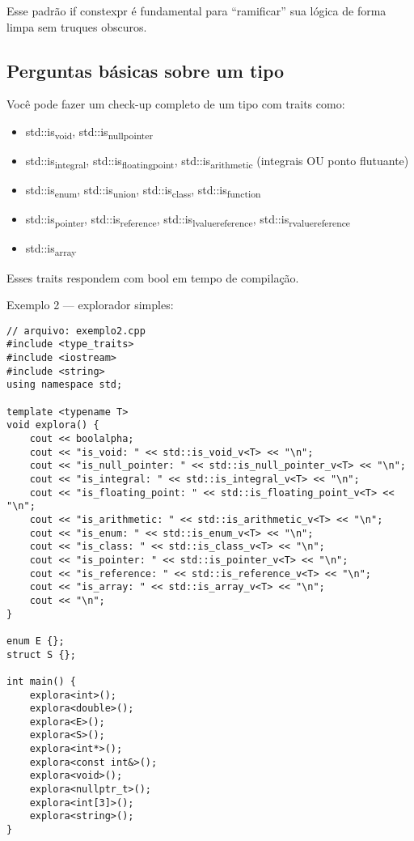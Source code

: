 \documentclass[11pt]{article}
\begin{document}
Esse padrão if constexpr é fundamental para “ramificar” sua lógica de forma limpa sem truques obscuros.
\subsection{Perguntas básicas sobre um tipo}
\label{sec:org7e893dd}

Você pode fazer um check-up completo de um tipo com traits como:
\begin{itemize}
\item std::is\textsubscript{void}, std::is\textsubscript{null}\textsubscript{pointer}
\item std::is\textsubscript{integral}, std::is\textsubscript{floating}\textsubscript{point}, std::is\textsubscript{arithmetic} (integrais OU ponto flutuante)
\item std::is\textsubscript{enum}, std::is\textsubscript{union}, std::is\textsubscript{class}, std::is\textsubscript{function}
\item std::is\textsubscript{pointer}, std::is\textsubscript{reference}, std::is\textsubscript{lvalue}\textsubscript{reference}, std::is\textsubscript{rvalue}\textsubscript{reference}
\item std::is\textsubscript{array}
\end{itemize}

Esses traits respondem com bool em tempo de compilação.

Exemplo 2 — explorador simples:
\begin{verbatim}
// arquivo: exemplo2.cpp
#include <type_traits>
#include <iostream>
#include <string>
using namespace std;

template <typename T>
void explora() {
    cout << boolalpha;
    cout << "is_void: " << std::is_void_v<T> << "\n";
    cout << "is_null_pointer: " << std::is_null_pointer_v<T> << "\n";
    cout << "is_integral: " << std::is_integral_v<T> << "\n";
    cout << "is_floating_point: " << std::is_floating_point_v<T> << "\n";
    cout << "is_arithmetic: " << std::is_arithmetic_v<T> << "\n";
    cout << "is_enum: " << std::is_enum_v<T> << "\n";
    cout << "is_class: " << std::is_class_v<T> << "\n";
    cout << "is_pointer: " << std::is_pointer_v<T> << "\n";
    cout << "is_reference: " << std::is_reference_v<T> << "\n";
    cout << "is_array: " << std::is_array_v<T> << "\n";
    cout << "\n";
}

enum E {};
struct S {};

int main() {
    explora<int>();
    explora<double>();
    explora<E>();
    explora<S>();
    explora<int*>();
    explora<const int&>();
    explora<void>();
    explora<nullptr_t>();
    explora<int[3]>();
    explora<string>();
}
\end{verbatim}
\end{document}
